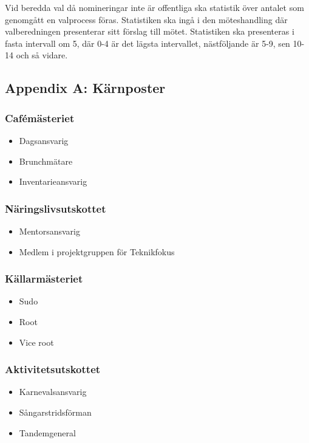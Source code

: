 \documentclass{dsekprotokoll}
\begin{document}
Vid beredda val då nomineringar inte är offentliga ska statistik över antalet som genomgått en valprocess föras. Statistiken ska ingå i den möteshandling där valberedningen presenterar sitt förslag till mötet. Statistiken ska presenteras i fasta intervall om 5, där 0-4
är det lägsta intervallet, nästföljande är 5-9, sen 10-14 och så
vidare.

\pagebreak
\subsection*{Appendix A: Kärnposter}
\begin{multicols}{2}

    \subsubsection*{Cafémästeriet}
    \begin{itemize}
        \item Dagsansvarig
        \item Brunchmätare
        \item Inventarieansvarig
    \end{itemize}

    \subsubsection*{Näringslivsutskottet}
    \begin{itemize}
        \item Mentorsansvarig
        \item Medlem i projektgruppen för Teknikfokus
    \end{itemize}

    \subsubsection*{Källarmästeriet}
    \begin{itemize}
        \item Sudo
        \item Root
        \item Vice root
    \end{itemize}

    \subsubsection*{Aktivitetsutskottet}
    \begin{itemize}
        \item Karnevalsansvarig
        \item Sångarstridsförman
        \item Tandemgeneral
    \end{itemize}


\end{multicols}
\end{document}
